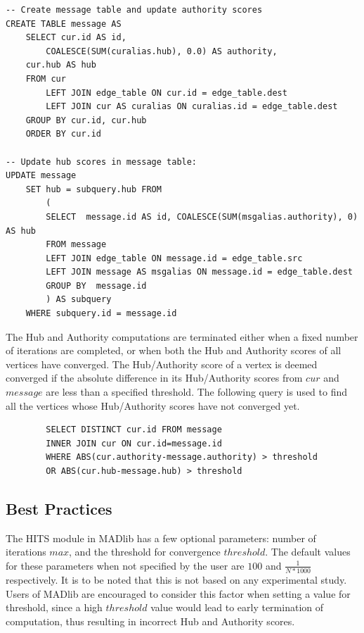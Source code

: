 \begin{algorithm}
\label{alg:hits:update}
\begin{lstlisting}
-- Create message table and update authority scores
CREATE TABLE message AS
	SELECT cur.id AS id,
		COALESCE(SUM(curalias.hub), 0.0) AS authority,
	cur.hub AS hub
	FROM cur
        LEFT JOIN edge_table ON cur.id = edge_table.dest
        LEFT JOIN cur AS curalias ON curalias.id = edge_table.dest
	GROUP BY cur.id, cur.hub
	ORDER BY cur.id

-- Update hub scores in message table:
UPDATE message
	SET hub = subquery.hub FROM
		(
		SELECT  message.id AS id, COALESCE(SUM(msgalias.authority), 0) AS hub
		FROM message
		LEFT JOIN edge_table ON message.id = edge_table.src
		LEFT JOIN message AS msgalias ON message.id = edge_table.dest
		GROUP BY  message.id
		) AS subquery
	WHERE subquery.id = message.id

\end{lstlisting}
\end{algorithm}


The Hub and Authority computations are terminated either when a fixed number of
iterations are completed, or when both the Hub and Authority scores of all
vertices have converged. The Hub/Authority score of a vertex is deemed
converged if the absolute difference in its Hub/Authority scores from $cur$ and
$message$ are less than a specified threshold.
The following query is used to find all the vertices whose Hub/Authority scores
have not converged yet.
\begin{algorithm}
\label{alg:hits:update1}
\begin{lstlisting}
		SELECT DISTINCT cur.id FROM message
		INNER JOIN cur ON cur.id=message.id
		WHERE ABS(cur.authority-message.authority) > threshold
		OR ABS(cur.hub-message.hub) > threshold
\end{lstlisting}
\end{algorithm}

\subsection{Best Practices} \label{sec:hits:bestpractices}

The HITS module in MADlib has a few optional parameters: number of iterations $max$,
and the threshold for convergence $threshold$.
The default values for these parameters when not specified by the user are $100$
and $\frac{1}{N*1000}$ respectively.
It is to be noted that this is not based on any experimental study. Users of
MADlib are encouraged to consider this factor when setting a value for threshold,
since a high $threshold$ value would lead to early termination of computation,
thus resulting in incorrect Hub and Authority scores.
